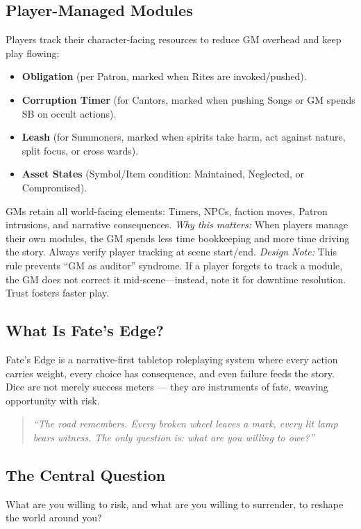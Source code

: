 \subsection{Player-Managed Modules}
Players track their character-facing resources to reduce GM overhead and keep play flowing:
\begin{itemize}
  \item \textbf{Obligation} (per Patron, marked when Rites are invoked/pushed).
  \item \textbf{Corruption Timer } (for Cantors, marked when pushing Songs or GM spends SB on occult actions).
  \item \textbf{Leash} (for Summoners, marked when spirits take harm, act against nature, split focus, or cross wards).
  \item \textbf{Asset States} (Symbol/Item condition: Maintained, Neglected, or Compromised).
\end{itemize}
GMs retain all world-facing elements: Timers, NPCs, faction moves, Patron intrusions, and narrative consequences.
\emph{Why this matters:} When players manage their own modules, the GM spends less time bookkeeping and more time driving the story. Always verify player tracking at scene start/end.
\emph{Design Note:} This rule prevents ``GM as auditor'' syndrome. If a player forgets to track a module, the GM does not correct it mid-scene---instead, note it for downtime resolution. Trust fosters faster play.

\subsection{What Is Fate's Edge?}

Fate's Edge is a narrative-first tabletop roleplaying system where every action carries weight, every choice has consequence, and even failure feeds the story. Dice are not merely success meters --- they are instruments of fate, weaving opportunity with risk.

\begin{quote}
\textit{``The road remembers. Every broken wheel leaves a mark, every lit lamp bears witness. The only question is: what are you willing to owe?''}
\end{quote}

\subsection{The Central Question}

What are you willing to risk, and what are you willing to surrender, to reshape the world around you?


